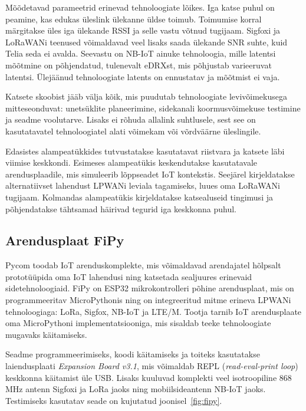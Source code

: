 \documentclass[12pt]{article}
\begin{document}
Mõõdetavad parameetrid erinevad tehnoloogiate lõikes.
Iga katse puhul on peamine, kas edukas üleslink ülekanne üldse toimub.
Toimumise korral märgitakse üles iga ülekande RSSI ja selle vastu võtnud tugijaam.
Sigfoxi ja LoRaWANi teenused võimaldavad veel lisaks saada ülekande SNR suhte, kuid Telia seda ei avalda.
Seevastu on NB-IoT ainuke tehnoloogia, mille latentsi mõõtmine on põhjendatud, tulenevalt eDRXst, mis põhjustab varieeruvat latentsi.
Ülejäänud tehnoloogiate latents on ennustatav ja mõõtmist ei vaja.

Katsete skoobist jääb välja kõik, mis puudutab tehnoloogiate levivõimekusega mitteseonduvat: unetsüklite planeerimine, sidekanali koormusvõimekuse testimine ja seadme voolutarve.
Lisaks ei rõhuda allalink suhtlusele, sest see on kasutatavatel tehnoloogiatel alati võimekam või võrdväärne üleslingile.

Edasistes alampeatükkides tutvustatakse kasutatavat riistvara ja katsete läbi viimise keskkondi.
Esimeses alampeatükis keskendutakse kasutatavale arendusplaadile, mis simuleerib lõppseadet IoT kontekstis.
Seejärel kirjeldatakse alternatiivset lahendust LPWANi leviala tagamiseks, luues oma LoRaWANi tugijaam.
Kolmandas alampeatükis kirjeldatakse katsealuseid tingimusi ja põhjendatakse tähtsamad häirivad tegurid iga keskkonna puhul.

\subsection{Arendusplaat FiPy}

Pycom toodab IoT arenduskomplekte, mis võimaldavad arendajatel hõlpsalt prototüüpida oma IoT lahendusi ning katsetada sealjuures erinevaid sidetehnoloogiaid.
FiPy on ESP32 mikrokontrolleri põhine arendusplaat, mis on programmeeritav MicroPythonis ning on integreeritud mitme erineva LPWANi tehnoloogiaga: LoRa, Sigfox, NB-IoT ja LTE\-/M.
Tootja tarnib IoT arendusplaate oma MicroPythoni implementatsiooniga, mis sisaldab teeke tehnoloogiate mugavaks käitamiseks.

Seadme programmeerimiseks, koodi käitamiseks ja toiteks kasutatakse laiendusplaati \textit{Expansion Board v3.1}, mis võimaldab REPL (\textit{read-eval-print loop}) keskkonna käitamist üle USB.
Lisaks kuuluvad komplekti veel isotroopiline 868 MHz antenn Sigfoxi ja LoRa jaoks ning mobiilsideantenn NB-IoT jaoks.
Testimiseks kasutatav seade on kujutatud joonisel~\ref{fig:fipy}.
\end{document}
